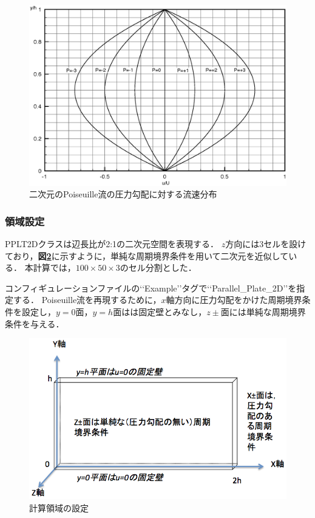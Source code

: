 \begin{figure}[htbp]
\centering
\includegraphics[width=12cm]{2DpoiseuilleG.eps}
\caption{二次元のPoiseuille流の圧力勾配に対する流速分布}
\label{Fig.poiseuilleG}
\end{figure}

\subsubsection{領域設定}
PPLT2Dクラスは辺長比が2:1の二次元空間を表現する．
$z$方向には3セルを設けており，\textbf{図\ref{Fig.poiseuilleP}}に示すように，単純な周期境界条件を用いて二次元を近似している．
本計算では，$100\times50\times3$のセル分割とした．

コンフィギュレーションファイルの\lq\lq Example\rq\rq タグで\lq\lq Parallel\_Plate\_2D\rq\rq を指定する．
Poiseuille流を再現するために，$x$軸方向に圧力勾配をかけた周期境界条件を設定し，$y=0$面，$y=h$面はは固定壁とみなし，$z\pm$面には単純な周期境界条件を与える．

\begin{figure}[htbp]
\centering
\includegraphics[width=12cm, bb=0 0 647 404]{model.png}
\caption{計算領域の設定}
\label{Fig.poiseuilleP}
\end{figure}

